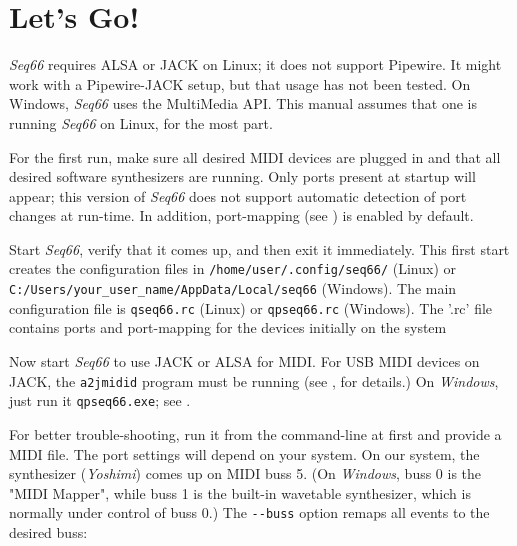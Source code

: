 %
%
%

\section{Let's Go!}
\label{sec:introduction_lets_go}

   \textsl{Seq66} requires ALSA or JACK on Linux;
   it does not support
   Pipewire.
   It might work with a Pipewire-JACK setup, but that usage has not been
   tested.
   On Windows, \textsl{Seq66} uses the MultiMedia API.
   This manual assumes that one is running \textsl{Seq66} on Linux, for the
   most part.

   For the first run, make sure all desired MIDI devices are plugged in and
   that all desired software synthesizers are running.
   Only ports present at startup will appear; this version of
   \textsl{Seq66} does not
   support automatic detection of port changes at run-time.
   In addition, port-mapping (see ) is
   enabled by default.

   Start \textsl{Seq66}, verify that it comes up, and then exit it
   immediately.
   This first start creates the configuration files in
   \texttt{/home/user/.config/seq66/} (Linux) or
   \texttt{C:/Users/your\_user\_name/AppData/Local/seq66} (Windows).
   The main configuration file is
   \texttt{qseq66.rc} (Linux) or
   \texttt{qpseq66.rc} (Windows).
   The '.rc' file contains ports and port-mapping for the devices
   initially on the system

   Now start \textsl{Seq66} to use JACK or ALSA for MIDI.
   For USB MIDI devices on JACK, the \texttt{a2jmidid} program must be running
   (see , for details.)
   On \textsl{Windows}, just run it \texttt{qpseq66.exe};
   see .

   For better trouble-shooting, run it from the command-line at first and
   provide a MIDI file.
   The port settings will depend on your system.
   On our system, the synthesizer (\textsl{Yoshimi}) comes up on MIDI buss 5.
   (On \textsl{Windows}, buss 0 is the "MIDI Mapper", while buss 1 is the
   built-in wavetable synthesizer, which is normally under control of buss 0.)
   The \texttt{-{}-buss} option remaps all events to the desired buss:

